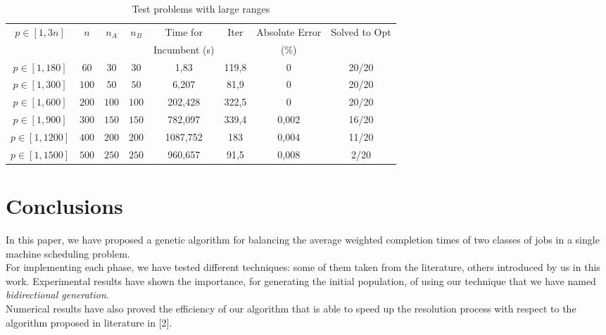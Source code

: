 \documentclass[opre,nonblindrev]{informs3} %
\begin{document}
\begin{table*}[h]\scriptsize
	\begin{center}
		\begin{tabular}{||c| c |c | c|| c||c ||c|| c||}\hline
			\multirow{3}{*}{$p \in [1,3n]$} &\multirow{3}{*}{$n$} & \multirow{3}{*}{$n_A$} & \multirow{3}{*}{$n_B$} & \multirow{2}{*}{Time for } & \multirow{3}{*}{Iter}& \multirow{2}{*}{Absolute Error }& \multirow{3}{*}{Solved to Opt}\\
			& &  &&  && & \\
			& &  &&Incumbent (s)  &&(\%)& \\
			
			\hline
			$p\in[1,180]$	 & $60$ & $30$   & $30$   &  1,83
			&  119,8 &0&20/20
			\\
			
			$p\in[1,300]$	 & $100$ & $50$   & $50$   &  6,207
			& 81,9&0&20/20
			\\
			$p\in[1,600]$ &$200$  &  $100$	 & $100$ &202,428
			&322,5&0&20/20
			\\ 
			
			$p\in[1,900] $ & $300$	 & $150$   & $150$   & 782,097
			& 339,4 &0,002 & 16/20
			
			\\
			$p\in[1,1200]$ & $400$  & $200$	 & $200$ & 1087,752
			&183 &0,004&11/20
			
			\\ 
			
			$p\in[1,1500]$ & $500$	 & $250$   & $250$   & 960,657
			
			& 91,5
			&0,008 &2/20
			
			\\ \hline
			
		\end{tabular}
	\end{center}
	\caption{Test problems with large ranges} \label{largexBid}
\end{table*}




\section{Conclusions}
In this paper, we have proposed a genetic algorithm for balancing the average weighted completion times of two classes of jobs in a single machine scheduling problem.\\ For implementing each phase, we have tested different techniques: some of them taken from the literature, others introduced by us in this work. Experimental results have shown the importance, for generating the initial population, of using our technique that we have named \textit{bidirectional generation}.\\
Numerical results have also proved the efficiency of our algorithm that is able to speed up the resolution process with respect to the algorithm proposed in literature in [2]. 



 

\end{document}
